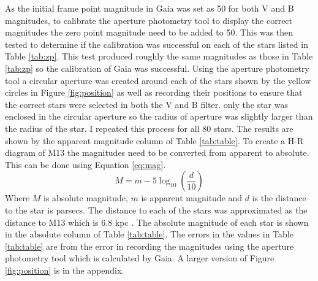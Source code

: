 \documentclass[10pt]{article}
\begin{document}
As the initial frame point magnitude in Gaia was set as 50 for both V and B magnitudes, to calibrate the aperture photometry tool to display the correct magnitudes the zero point magnitude need to be added to 50. This was then tested to determine if the calibration was successful on each of the stars listed in Table \ref{tab:zp}. This test produced roughly the same magnitudes as those in Table \ref{tab:zp} so the calibration of Gaia was successful. Using the aperture photometry tool a circular aperture was created around each of the stars shown by the yellow circles in Figure \ref{fig:position} as well as recording their positions to ensure that the correct stars were selected in both the V and B filter. only the star was enclosed in the circular aperture so the radius of aperture was slightly larger than the radius of the star. I repeated this process for all 80 stars. The results are shown by the apparent magnitude column of Table \ref{tab:table}. To create a H-R diagram of M13 the magnitudes need to be converted from apparent to absolute. This can be done using Equation \ref{eq:mag}.
\begin{equation}
	M = m - 5 \log _{10}\left(\frac{d}{10}\right)
	\label{eq:mag}
\end{equation}
Where $M$ is absolute magnitude, $m$ is apparent magnitude and $d$ is the distance to the star is parsecs. The distance to each of the stars was approximated as the distance to M13 which is 6.8 kpc \citep[Table 4]{Paust_2010}. The absolute magnitude of each star is shown in the absolute column of Table \ref{tab:table}. The errors in the values in Table \ref{tab:table} are from the error in recording the magnitudes using the aperture photometry tool which is calculated by Gaia. A larger version of Figure \ref{fig:position} is in the appendix.
\end{document}
